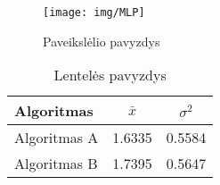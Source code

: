 \documentclass[
    english, %
]{VUMIFPSkursinis}
\begin{document}

\begin{figure}[H]
    \centering
    \texttt{[image: img/MLP]}
    \caption{Paveikslėlio pavyzdys}
    \label{img:mlp}
\end{figure}



\begin{table}[H]\footnotesize
  \centering
  \caption{Lentelės pavyzdys}
  {\begin{tabular}{|l|c|c|} \hline
    Algoritmas & $\bar{x}$ & $\sigma^{2}$ \\
    \hline
    Algoritmas A  & 1.6335    & 0.5584       \\
    Algoritmas B  & 1.7395    & 0.5647       \\
    \hline
  \end{tabular}}
  \label{tab:table example}
\end{table}
\end{document}
